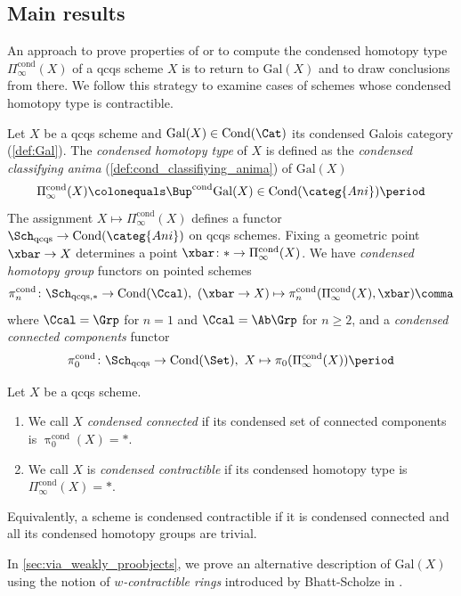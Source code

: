 \documentclass[leqno]{article}
\renewcommand{\Gal}{\mathrm{Gal}}
\newcommand{\Ani}{\categ{Ani}}
\DeclareMathOperator{\Cond}{Cond}
\newcommand{\CondAni}{\Cond(\Ani)}
\newcommand{\CondSet}{\Cond(\Set)}
\newcommand{\cond}{\mathrm{cond}}
\newcommand{\Bcond}{\Bup^{\cond}}
\newcommand{\Picond}{\Pi_{\infty}^{\cond}}
\newcommand{\CondShape}[1]{\Picond(#1)}
\newcommand{\picond}{\uppi^{\cond}}
\newcommand{\pizerocond}{\picond_0}
\begin{document}
\subsection*{Main results}
An approach to prove properties of or to compute the condensed homotopy type $\CondShape{X}$ of a qcqs scheme $X$ is to return to $\Gal(X)$ and to draw conclusions from there.
We follow this strategy to examine cases of schemes whose condensed homotopy type is contractible.
\begin{recollection}
Let $X$ be a qcqs scheme and $\Gal(X)\in \Cond(\Cat)$ its condensed Galois category (\cref{def:Gal}). The \textit{condensed homotopy type} of $X$ is defined as the \textit{condensed classifying anima} (\cref{def:cond_classifiying_anima}) of $\Gal(X)$
$$\CondShape{X}\colonequals\Bcond\Gal(X)\in \CondAni\period$$ The assignment $X\mapsto \CondShape{X}$ defines a functor $\Sch_{\mathrm{qcqs}}\rightarrow \CondAni$ on qcqs schemes.
Fixing a geometric point $\xbar\rightarrow X$ determines a point $\xbar\colon\ast\rightarrow \CondShape{X}$. We have \textit{condensed homotopy group} functors on pointed schemes
    $$\pi_n^{\cond}\colon \Sch_{\mathrm{qcqs},
*}\rightarrow \Cond(\Ccal),\ (\xbar \rightarrow X) \mapsto \pi_n^{\cond}(\CondShape{X},\xbar)\comma $$
where $\Ccal=\Grp$ for $n=1$ and $\Ccal=\Ab\Grp$ for $n\geq 2$,
and a \textit{condensed connected components} functor
$$\pi_0^{\cond}\colon \Sch_{\mathrm{qcqs}}\rightarrow \CondSet, \ X \mapsto \pi_0(\CondShape{X})\period$$
\end{recollection}
%
\begin{definition}
    Let $X$ be a qcqs scheme.
    \begin{enumerate}
        \item We call $X$ \textit{condensed connected} if its condensed set of connected components is $\pizerocond(X)=\ast$. 
        \item We call $X$ is \textit{condensed contractible} if its condensed homotopy type is $\CondShape{X}=\ast$. 
    \end{enumerate}
\end{definition}
%
\begin{remark}
Equivalently, a scheme is condensed contractible if it is condensed connected and all its condensed homotopy groups are trivial.    
\end{remark}
%
In \cref{sec:via_weakly_proobjects}, we prove an alternative description of $\Gal(X)$ using the notion of \textit{$w$-contractible rings}  introduced by Bhatt-Scholze in \cite{MR3379634}. 
\end{document}
